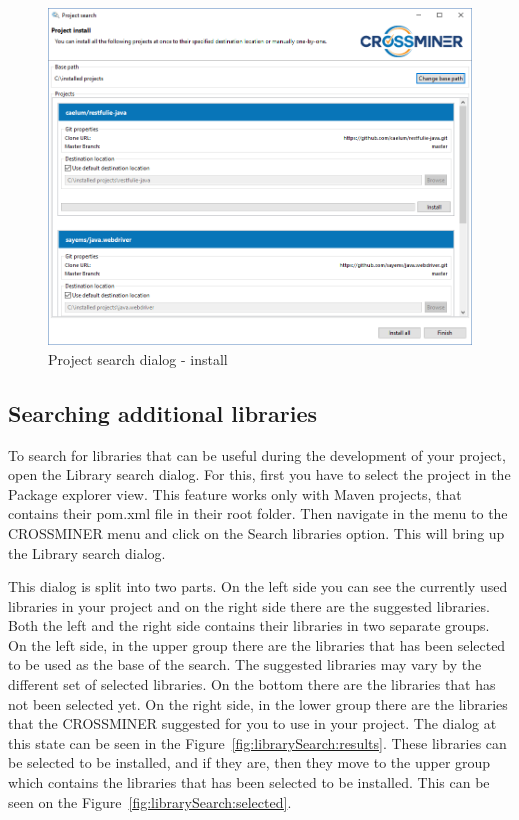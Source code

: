 \documentclass[11pt,a4paper]{book}
\begin{document}
\begin{figure}[h]
	\centering
	\includegraphics[width=\linewidth]{pic/project-search-install.png}
	\caption{Project search dialog - install}
	\label{fig:projectSearchDialogInstall}
\end{figure}

\subsection{Searching additional libraries}

To search for libraries that can be useful during the development of your project, open the Library search dialog. For this, first you have to select the project in the Package explorer view. This feature works only with Maven projects, that contains their pom.xml file in their root folder. Then navigate in the menu to the CROSSMINER menu and click on the Search libraries option. This will bring up the Library search dialog.

This dialog is split into two parts. On the left side you can see the currently used libraries in your project and on the right side there are the suggested libraries. Both the left and the right side contains their libraries in two separate groups. On the left side, in the upper group there are the libraries that has been selected to be used as the base of the search. The suggested libraries may vary by the different  set of selected libraries. On the bottom there are the libraries that has not been selected yet. On the right side, in the lower group there are the libraries that the CROSSMINER suggested for you to use in your project. The dialog at this state can be seen in the Figure~\ref{fig:librarySearch:results}. These libraries can be selected to be installed, and if they are, then they move to the upper group which contains the libraries that has been selected to be installed. This can be seen on the Figure~\ref{fig:librarySearch:selected}.
\end{document}
